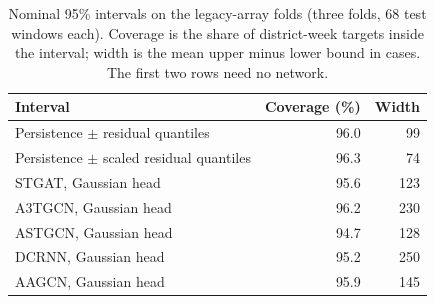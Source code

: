 \begin{table}[t]
\centering
\caption{Nominal 95\% intervals on the legacy-array folds (three folds, 68 test windows each). Coverage is the share of district-week targets inside the interval; width is the mean upper minus lower bound in cases. The first two rows need no network.}
\label{tab:interval}
\footnotesize
\begin{tabular}{@{}lrr@{}}
\toprule
Interval & Coverage (\%) & Width \\
\midrule
Persistence $\pm$ residual quantiles & 96.0 & 99 \\ %
Persistence $\pm$ scaled residual quantiles & 96.3 & 74 \\ %
\midrule
STGAT, Gaussian head & 95.6 & 123 \\ %
A3TGCN, Gaussian head & 96.2 & 230 \\ %
ASTGCN, Gaussian head & 94.7 & 128 \\ %
DCRNN, Gaussian head & 95.2 & 250 \\ %
AAGCN, Gaussian head & 95.9 & 145 \\ %
\bottomrule
\end{tabular}
\end{table}
